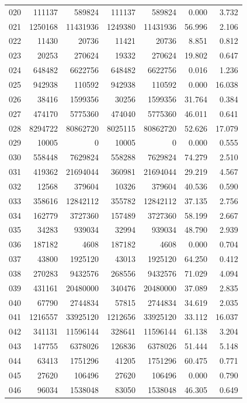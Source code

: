 \begin{longtable}{lrrrrrr}
020 & 111137 & 589824 & 111137 & 589824 & 0.000 & 3.732\\
021 & 1250168 & 11431936 & 1249380 & 11431936 & 56.996 & 2.106\\
022 & 11430 & 20736 & 11421 & 20736 & 8.851 & 0.812\\
023 & 20253 & 270624 & 19332 & 270624 & 19.802 & 0.647\\
024 & 648482 & 6622756 & 648482 & 6622756 & 0.016 & 1.236\\
025 & 942938 & 110592 & 942938 & 110592 & 0.000 & 16.038\\
026 & 38416 & 1599356 & 30256 & 1599356 & 31.764 & 0.384\\
027 & 474170 & 5775360 & 474040 & 5775360 & 46.011 & 0.641\\
028 & 8294722 & 80862720 & 8025115 & 80862720 & 52.626 & 17.079\\
029 & 10005 & 0 & 10005 & 0 & 0.000 & 0.555\\
030 & 558448 & 7629824 & 558288 & 7629824 & 74.279 & 2.510\\
031 & 419362 & 21694044 & 360981 & 21694044 & 29.219 & 4.567\\
032 & 12568 & 379604 & 10326 & 379604 & 40.536 & 0.590\\
033 & 358616 & 12842112 & 355782 & 12842112 & 37.135 & 2.756\\
034 & 162779 & 3727360 & 157489 & 3727360 & 58.199 & 2.667\\
035 & 34283 & 939034 & 32994 & 939034 & 48.790 & 2.939\\
036 & 187182 & 4608 & 187182 & 4608 & 0.000 & 0.704\\
037 & 43800 & 1925120 & 43013 & 1925120 & 64.250 & 0.412\\
038 & 270283 & 9432576 & 268556 & 9432576 & 71.029 & 4.094\\
039 & 431161 & 20480000 & 340476 & 20480000 & 37.089 & 2.835\\
040 & 67790 & 2744834 & 57815 & 2744834 & 34.619 & 2.035\\
041 & 1216557 & 33925120 & 1212656 & 33925120 & 33.112 & 16.037\\
042 & 341131 & 11596144 & 328641 & 11596144 & 61.138 & 3.204\\
043 & 147755 & 6378026 & 126836 & 6378026 & 51.444 & 5.148\\
044 & 63413 & 1751296 & 41205 & 1751296 & 60.475 & 0.771\\
045 & 27620 & 106496 & 27620 & 106496 & 0.000 & 0.790\\
046 & 96034 & 1538048 & 83050 & 1538048 & 46.305 & 0.649\\

\end{longtable}
